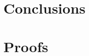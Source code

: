 \documentclass[a4j,12pt,oneside,openany,english,dvipdfmx]{jsbook}
\begin{document}

\chapter{Conclusions}

\appendix
\chapter{Proofs}
\end{document}
